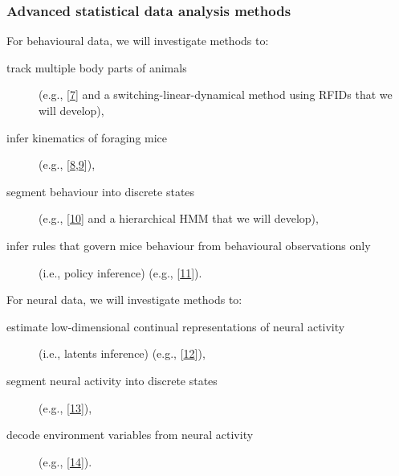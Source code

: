 \documentclass{beamer}
\begin{document}
\begin{frame}
    \frametitle{Advanced statistical data analysis methods}

    \small
For behavioural data, we will investigate methods to:

\begin{description}

    \item[track multiple body parts of animals] (e.g.,
        [\href{https://pubmed.ncbi.nlm.nih.gov/30127430/}{7}] and a
        switching-linear-dynamical method using RFIDs that we will develop),

    \item[infer kinematics of foraging mice] (e.g.,
        [\href{https://github.com/joacorapela/lds\_python}{8},\href{https://www.cambridge.org/core/books/fundamentals-of-object-tracking/A543B0EA12957B353BE4B5D0602EE945}{9}]),

    \item[segment behaviour into discrete states] (e.g.,
        [\href{https://pubmed.ncbi.nlm.nih.gov/26687221/}{10}]
        and a hierarchical HMM that we will develop),

    \item[infer rules that govern mice behaviour from behavioural
        observations only] (i.e., policy inference) (e.g.,
        [\href{https://arxiv.org/abs/2311.13870v2}{11}]).

\end{description}

For neural data, we will investigate methods to:

\begin{description}

    \item[estimate low-dimensional continual representations of neural
        activity]
        (i.e., latents inference) (e.g.,
        [\href{https://papers.nips.cc/paper_files/paper/2011/hash/7143d7fbadfa4693b9eec507d9d37443-Abstract.html}{12}]),

    \item[segment neural activity into discrete states] (e.g.,
        [\href{https://pubmed.ncbi.nlm.nih.gov/21299424/}{13}]),

    \item[decode environment variables from neural activity] (e.g.,
        [\href{https://pubmed.ncbi.nlm.nih.gov/25973549/}{14}]).

\end{description}
\end{frame}
\end{document}
